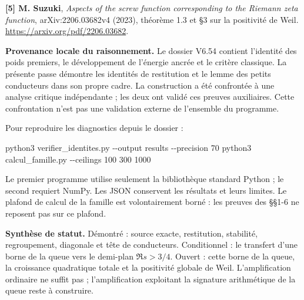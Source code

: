 \documentclass[
  11pt,
  a4paper,
]{article}
\newenvironment{Shaded}{}{}
\newcommand{\AttributeTok}[1]{\textcolor[rgb]{0.49,0.56,0.16}{#1}}
\newcommand{\ExtensionTok}[1]{#1}
\newcommand{\NormalTok}[1]{#1}
\begin{document}
\textbf{{[}5{]} M. Suzuki}, \emph{Aspects of the screw function
corresponding to the Riemann zeta function}, arXiv:2206.03682v4 (2023),
théorème 1.3 et §3 sur la positivité de Weil.
\url{https://arxiv.org/pdf/2206.03682}.

\textbf{Provenance locale du raisonnement.} Le dossier V6.54 contient
l'identité des poids premiers, le développement de l'énergie ancrée et
le critère classique. La présente passe démontre les identités de
restitution et le lemme des petits conducteurs dans son propre cadre. La
construction a été confrontée à une analyse critique indépendante ; les
deux ont validé ces preuves auxiliaires. Cette confrontation n'est pas
une validation externe de l'ensemble du programme.

Pour reproduire les diagnostics depuis le dossier :

\begin{Shaded}
\begin{Highlighting}[]
\ExtensionTok{python3}\NormalTok{ verifier\_identites.py }\AttributeTok{{-}{-}output}\NormalTok{ results }\AttributeTok{{-}{-}precision}\NormalTok{ 70}
\ExtensionTok{python3}\NormalTok{ calcul\_famille.py }\AttributeTok{{-}{-}ceilings}\NormalTok{ 100 300 1000}
\end{Highlighting}
\end{Shaded}

Le premier programme utilise seulement la bibliothèque standard Python ;
le second requiert NumPy. Les JSON conservent les résultats et leurs
limites. Le plafond de calcul de la famille est volontairement borné :
les preuves des §§1-6 ne reposent pas sur ce plafond.

\textbf{Synthèse de statut.} Démontré : source exacte, restitution,
stabilité, regroupement, diagonale et tête de conducteurs. Conditionnel
: le transfert d'une borne de la queue vers le demi-plan \(\Re s>3/4\).
Ouvert : cette borne de la queue, la croissance quadratique totale et la
positivité globale de Weil. L'amplification ordinaire ne suffit pas ;
l'amplification exploitant la signature arithmétique de la queue reste à
construire.
\end{document}

